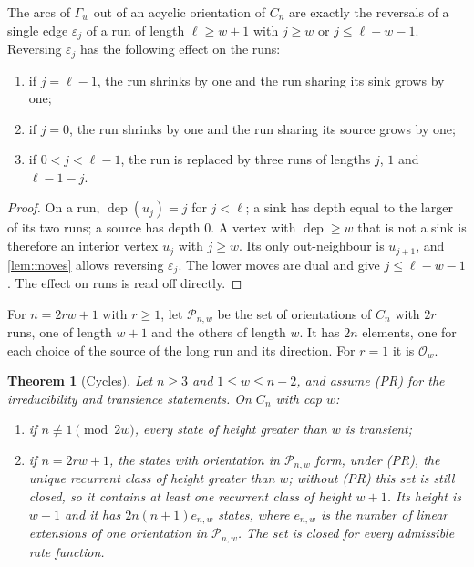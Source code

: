 \documentclass[11pt,a4paper]{article}
\newtheorem{theorem}{Theorem}[section]
\theoremstyle{plain}
\theoremstyle{plain}
\newcommand{\dep}{\operatorname{dep}}
\newcommand{\Obal}{\mathcal{O}}
\newcommand{\Pat}{\mathcal{P}}
\newcommand{\G}{\Gamma}
\begin{document}
\begin{lemma}\label{lem:cyclemoves}
The arcs of $\G_w$ out of an acyclic orientation of $C_n$ are exactly the reversals of a single edge $\varepsilon_j$ of a run of length $\ell\ge w+1$ with $j\ge w$ or $j\le\ell-w-1$. Reversing $\varepsilon_j$ has the following effect on the runs:
\begin{enumerate}[label=(\roman*)]
\item if $j=\ell-1$, the run shrinks by one and the run sharing its sink grows by one;
\item if $j=0$, the run shrinks by one and the run sharing its source grows by one;
\item if $0<j<\ell-1$, the run is replaced by three runs of lengths $j$, $1$ and $\ell-1-j$.
\end{enumerate}
\end{lemma}

\begin{proof}
On a run, $\dep(u_j)=j$ for $j<\ell$; a sink has depth equal to the larger of its two runs; a source has depth $0$. A vertex with $\dep\ge w$ that is not a sink is therefore an interior vertex $u_j$ with $j\ge w$. Its only out-neighbour is $u_{j+1}$, and \cref{lem:moves} allows reversing $\varepsilon_j$. The lower moves are dual and give $j\le\ell-w-1$. The effect on runs is read off directly.
\end{proof}

For $n=2rw+1$ with $r\ge1$, let $\Pat_{n,w}$ be the set of orientations of $C_n$ with $2r$ runs, one of length $w+1$ and the others of length $w$. It has $2n$ elements, one for each choice of the source of the long run and its direction. For $r=1$ it is $\Obal_w$.

\begin{theorem}[Cycles]\label{thm:cycles}
Let $n\ge3$ and $1\le w\le n-2$, and assume (PR) for the irreducibility and transience statements. On $C_n$ with cap $w$:
\begin{enumerate}[label=(\roman*)]
\item if $n\not\equiv1\pmod{2w}$, every state of height greater than $w$ is transient;
\item if $n=2rw+1$, the states with orientation in $\Pat_{n,w}$ form, under (PR), the unique recurrent class of height greater than $w$; without (PR) this set is still closed, so it contains at least one recurrent class of height $w+1$. Its height is $w+1$ and it has $2n(n+1)e_{n,w}$ states, where $e_{n,w}$ is the number of linear extensions of one orientation in $\Pat_{n,w}$. The set is closed for every admissible rate function.
\end{enumerate}
\end{theorem}
\end{document}

